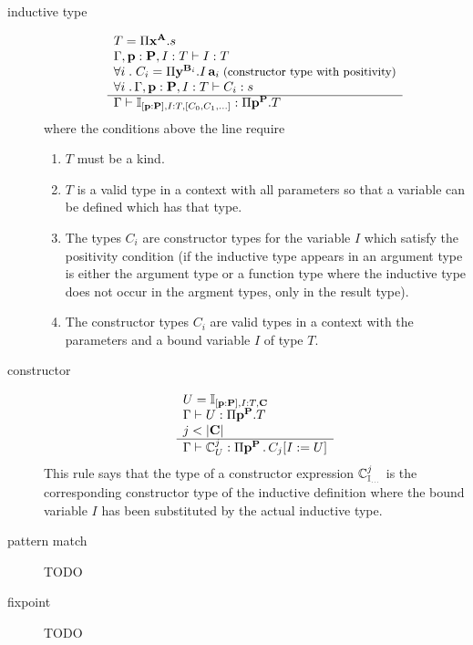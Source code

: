 \begin{definition}
\begin{description}
  \item[inductive type]
    $$
    \begin{array}{l}  T = \Pi \mathbf{x}^{\mathbf{A}}.s
      \\
      \Gamma, \mathbf{p}:\mathbf{P}, I:T \vdash I:T
      \\
      \forall i\;.\; C_i = \Pi \mathbf{y}^{\mathbf{B}_i}. I \, \mathbf{a}_i
      \;\text{\small(constructor type with positivity)}
      \\
      \forall i\;.\, \Gamma, \mathbf{p}:\mathbf{P}, I:T \vdash C_i : s
     \\ \hline 
      \Gamma \vdash
      \mathbb{I}_{[\mathbf{p}:\mathbf{P}], I:T, [C_0,C_1,\ldots]}
      :
      \Pi \mathbf{p}^{\mathbf{P}} . T
    \end{array}
    $$
    where the conditions above the line require
    \begin{enumerate}
    \item $T$ must be a kind.

    \item $T$ is a valid type in a context with all parameters so that a
      variable can be defined which has that type.

    \item The types $C_i$ are constructor types for the variable $I$ which
      satisfy the positivity condition (if the inductive
      type appears in an argument type is either the argument type or a
      function type where the inductive type does not occur in the argment
      types, only in the result type).

    \item The constructor types $C_i$ are valid types in a context with the
      parameters and a bound variable $I$ of type $T$.
    \end{enumerate}


  \item[constructor]
    $$
    \begin{array}{l} 
      U = \mathbb{I}_{[\mathbf{p}:\mathbf{P}], I:T, \mathbf{C}}
      \\
      \Gamma
      \vdash
      U
      :
      \Pi \mathbf{p}^{\mathbf{P}}.T
      \\
      j < |\mathbf{C}|
     \\ \hline 
      \Gamma \vdash
      \mathbb{C}^j_U
      :
      \Pi \mathbf{p}^{\mathbf{P}} \,.\, C_j[I := U]
    \end{array}
    $$
    This rule says that the type of a constructor expression
    $\mathbb{C}^j_{\mathbb{I}_{\ldots}}$ is the corresponding constructor type
    of the inductive definition where the bound variable $I$ has been
    substituted by the actual inductive type.


  \item[pattern match]
    TODO

  \item[fixpoint]
    TODO

  \end{description}
\end{definition}




